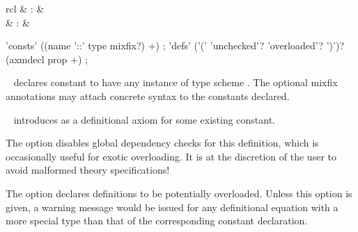 \begin{isabellebody}
\begin{isamarkuptext}
  \begin{matharray}{rcl}
    \hypertarget{command.consts}{\hyperlink{command.consts}{\mbox{}}} & : &  \\
    \hypertarget{command.defs}{\hyperlink{command.defs}{\mbox{}}} & : &  \\
  \end{matharray}

  \begin{rail}
    'consts' ((name '::' type mixfix?) +)
    ;
    'defs' ('(' 'unchecked'? 'overloaded'? ')')? \\ (axmdecl prop +)
    ;
  \end{rail}

  \begin{description}

  \item \hyperlink{command.consts}{\mbox{}}~ declares constant  to have any instance of type scheme .  The optional
  mixfix annotations may attach concrete syntax to the constants
  declared.
  
  \item \hyperlink{command.defs}{\mbox{}}~ introduces 
  as a definitional axiom for some existing constant.
  
  The  option disables global dependency checks
  for this definition, which is occasionally useful for exotic
  overloading.  It is at the discretion of the user to avoid malformed
  theory specifications!
  
  The  option declares definitions to be
  potentially overloaded.  Unless this option is given, a warning
  message would be issued for any definitional equation with a more
  special type than that of the corresponding constant declaration.
  

\end{description}
\end{isamarkuptext}
\end{isabellebody}
